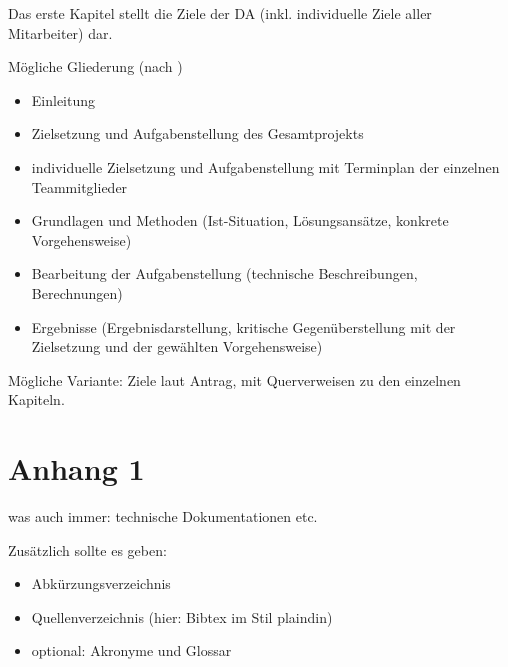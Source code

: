 \documentclass[
    headings=optiontotocandhead,%
    twoside,
    numbers=noenddot,%
    toc=flat, %
    12pt, %
    titlepage, %
    parskip=full, %
    listof=totoc, %
    listof=flat, %
    numbers=noenddot, %
    bibliography=totoc, %
    a4paper,DIV=14,
    BCOR=15mm,
]{scrbook}
\begin{document}
Das erste Kapitel stellt die Ziele der DA (inkl. individuelle Ziele
aller Mitarbeiter) dar.

Mögliche Gliederung (nach \cite{leitfaden})

\begin{itemize}
\item  Einleitung
\item   Zielsetzung und Aufgabenstellung des Gesamtprojekts
\item   individuelle Zielsetzung und Aufgabenstellung mit Terminplan der einzelnen Teammitglieder
\item   Grundlagen und Methoden (Ist-Situation, Lösungsansätze, konkrete Vorgehensweise)
\item   Bearbeitung der Aufgabenstellung (technische Beschreibungen, Berechnungen)
\item   Ergebnisse (Ergebnisdarstellung, kritische Gegenüberstellung mit der Zielsetzung
 und der gewählten Vorgehensweise)
\end{itemize}

Mögliche Variante: Ziele laut Antrag, mit Querverweisen zu den einzelnen Kapiteln.









\appendix

\chapter{Anhang 1}\label{ch:anhang-1}

was auch immer: technische Dokumentationen etc.

Zusätzlich sollte es geben:
\begin{itemize}
\item Abkürzungsverzeichnis
\item Quellenverzeichnis (hier: Bibtex im Stil plaindin)
\item optional: Akronyme und Glossar
\end{itemize}

\printglossary[type=\acronymtype, title=Abkürzungsverzeichnis, toctitle=Abkürzungsverzeichnis]
\printglossary[type=main, title=Glossar, toctitle=Glossar]
\end{document}
